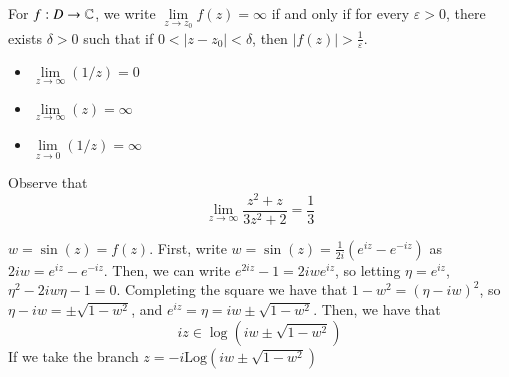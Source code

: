 \begin{definition}
    For $f:D\rightarrow \mathbb C$, we write $\lim\limits_{z\rightarrow z_0}f(z) = \infty$ if and only if for every $\varepsilon > 0$, there exists $\delta > 0$ such that if $0 < |z-z_0| < \delta$, then $|f(z)| > \frac{1}{\varepsilon}$.
\end{definition}

\begin{example}
    \leavevmode
    \begin{itemize}
        \item $\lim\limits_{z\rightarrow \infty}(1/z) = 0$
        \item $\lim\limits_{z\rightarrow \infty}(z) = \infty$
        \item $\lim\limits_{z\rightarrow 0}(1/z) = \infty$
    \end{itemize}
\end{example}

\begin{example}
    Observe that \begin{equation*}
        \lim\limits_{z\rightarrow \infty}\frac{z^2+z}{3z^2+2} = \frac{1}{3}
    \end{equation*}
\end{example}

\begin{example}
    $w = \sin(z) = f(z)$. First, write $w=\sin(z) = \frac{1}{2i}(e^{iz}-e^{-iz})$ as $2iw = e^{iz}-e^{-iz}$. Then, we can write $e^{2iz}-1 = 2iwe^{iz}$, so letting $\eta = e^{iz}$, $\eta^2 - 2iw\eta -1 = 0$. Completing the square we have that $1 -w^2= (\eta-iw)^2$, so $\eta-iw = \pm \sqrt{1-w^2}$, and $e^{iz}=\eta = iw\pm\sqrt{1-w^2}$. Then, we have that \begin{equation*}
        iz \in \log(iw\pm\sqrt{1-w^2})
    \end{equation*}
    If we take the branch $z = -i\text{Log}(iw\pm \sqrt{1-w^2})$
\end{example}
